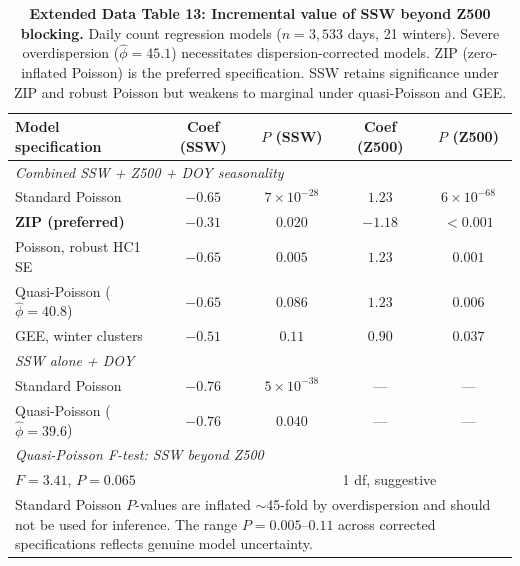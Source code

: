 \documentclass[11pt,letterpaper]{article}
\begin{document}
\begin{table}[!ht]
\centering
\caption{\textbf{Extended Data Table 13: Incremental value of SSW beyond Z500 blocking.}
Daily count regression models ($n = 3{,}533$ days, 21 winters). Severe overdispersion ($\hat{\phi} = 45.1$) necessitates dispersion-corrected models. ZIP (zero-inflated Poisson) is the preferred specification. SSW retains significance under ZIP and robust Poisson but weakens to marginal under quasi-Poisson and GEE.}
\label{tab:incremental}
\small
\begin{tabular}{lcccc}
\toprule
Model specification & Coef (SSW) & $P$ (SSW) & Coef (Z500) & $P$ (Z500) \\
\midrule
\multicolumn{5}{l}{\textit{Combined SSW + Z500 + DOY seasonality}} \\
Standard Poisson & $-0.65$ & $7 \times 10^{-28}$ & $1.23$ & $6 \times 10^{-68}$ \\
\textbf{ZIP (preferred)} & $\mathbf{-0.31}$ & $\mathbf{0.020}$ & $\mathbf{-1.18}$ & $\mathbf{< 0.001}$ \\
Poisson, robust HC1 SE & $-0.65$ & $0.005$ & $1.23$ & $0.001$ \\
Quasi-Poisson ($\hat{\phi} = 40.8$) & $-0.65$ & $0.086$ & $1.23$ & $0.006$ \\
GEE, winter clusters & $-0.51$ & $0.11$ & $0.90$ & $0.037$ \\
\midrule
\multicolumn{5}{l}{\textit{SSW alone + DOY}} \\
Standard Poisson & $-0.76$ & $5 \times 10^{-38}$ & --- & --- \\
Quasi-Poisson ($\hat{\phi} = 39.6$) & $-0.76$ & $0.040$ & --- & --- \\
\midrule
\multicolumn{5}{l}{\textit{Quasi-Poisson F-test: SSW beyond Z500}} \\
\multicolumn{3}{l}{$F = 3.41$, $P = 0.065$} & \multicolumn{2}{l}{1 df, suggestive} \\
\bottomrule
\multicolumn{5}{p{12cm}}{\footnotesize Standard Poisson $P$-values are inflated $\sim$45-fold by overdispersion and should not be used for inference. The range $P = 0.005$--$0.11$ across corrected specifications reflects genuine model uncertainty.} \\
\end{tabular}
\end{table}
\end{document}
